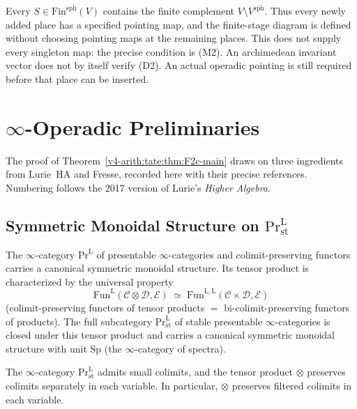 \begin{correction}
Every \(S\in\mathrm{Fin}^{\mathrm{sph}}(V)\) contains the finite
complement \(V\setminus V^{\mathrm{sph}}\). Thus every newly added
place has a specified pointing map, and the finite-stage diagram
is defined without choosing pointing maps at the remaining
places. This does not supply every singleton map: the precise
condition is (M2). An archimedean invariant vector does not by
itself verify (D2). An actual operadic pointing is still required
before that place can be inserted.
\end{correction}

\section{\(\infty\)-Operadic Preliminaries}
\label{v4-arith:tate:operadic-prelim}

The proof of Theorem~\ref{v4-arith:tate:thm:F2c-main} draws on three
ingredients from Lurie~HA and Fresse, recorded here with their
precise references. Numbering follows the 2017 version of
Lurie's \emph{Higher Algebra}.

\subsection{Symmetric Monoidal Structure on \(\mathrm{Pr}^{\mathrm{L}}_{\mathrm{st}}\)}
\label{v4-arith:tate:prelim-prl}

\begin{theorem}[HA~4.8.1.15, HA~4.8.2.18]
\label{v4-arith:tate:thm:prl-symmetric-monoidal}
\ClaimStatusProvedElsewhere The \(\infty\)-category
\(\mathrm{Pr}^{\mathrm{L}}\) of presentable \(\infty\)-categories and
colimit-preserving functors carries a canonical symmetric monoidal
structure. Its tensor product is characterized by the universal property
\[
\mathrm{Fun}^{\mathrm{L}}(\mathcal{C}\otimes\mathcal{D},\mathcal{E})
\;\simeq\;
\mathrm{Fun}^{\mathrm{L},\mathrm{L}}(\mathcal{C}\times\mathcal{D},\mathcal{E})
\]
(colimit-preserving functors of tensor products \(=\)
bi-colimit-preserving functors of products). The full subcategory
\(\mathrm{Pr}^{\mathrm{L}}_{\mathrm{st}}\) of stable presentable
\(\infty\)-categories is closed under this tensor product and carries
a canonical symmetric monoidal structure with unit \(\mathrm{Sp}\) (the
\(\infty\)-category of spectra).
\end{theorem}

\begin{corollary}[HA~4.8.1.24 and HA~4.8.2.18]
\label{v4-arith:tate:cor:prl-admits-colimits}
\ClaimStatusProvedElsewhere The \(\infty\)-category
\(\mathrm{Pr}^{\mathrm{L}}_{\mathrm{st}}\) admits small colimits, and
the tensor product \(\otimes\) preserves colimits separately in each
variable. In particular, \(\otimes\) preserves filtered colimits in
each variable.
\end{corollary}

